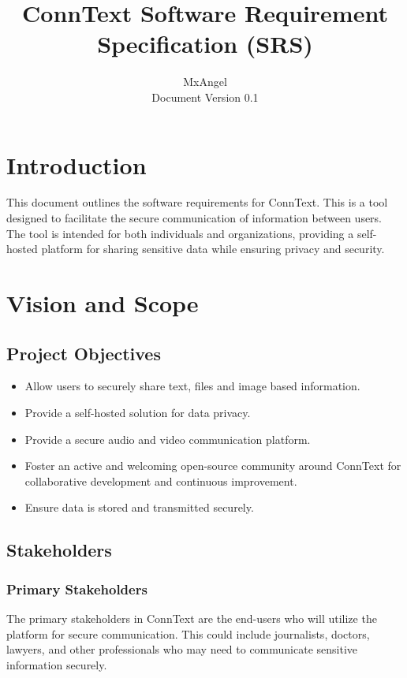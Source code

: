 \documentclass{article}
\title{ConnText Software Requirement Specification (SRS)}
\author{MxAngel \\ \small Document Version 0.1}
\date{}
\begin{document}
\maketitle
{
  \hypersetup{linkcolor=black}
  \tableofcontents
}


\section{Introduction}
This document outlines the software requirements for ConnText. This is a tool designed to facilitate the secure communication of information between users. The tool is intended for both individuals and organizations, providing a self-hosted platform for sharing sensitive data while ensuring privacy and security.

\section{Vision and Scope}
\subsection{Project Objectives}
\begin{itemize}
    \item Allow users to securely share text, files and image based information.
    \item Provide a self-hosted solution for data privacy.
    \item Provide a secure audio and video communication platform.
    \item Foster an active and welcoming open-source community around ConnText for collaborative development and continuous improvement.
    \item Ensure data is stored and transmitted securely.
\end{itemize}


\subsection{Stakeholders}
\subsubsection{Primary Stakeholders}
The primary stakeholders in ConnText are the end-users who will utilize the platform for secure communication. This could include journalists, doctors, lawyers, and other professionals who may need to communicate sensitive information securely.
\end{document}
